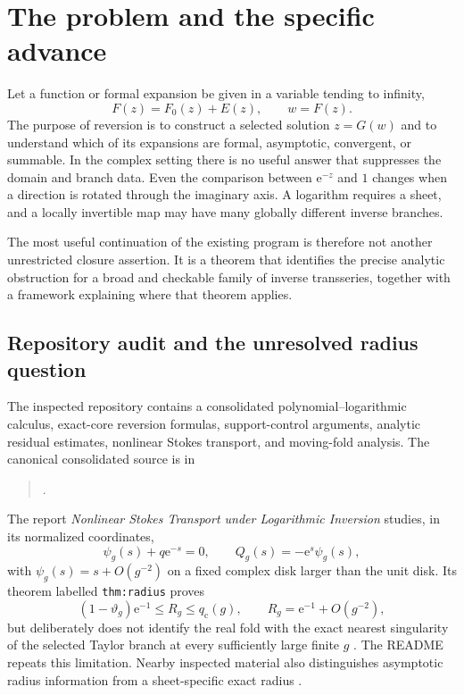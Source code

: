 \documentclass[11pt,a4paper]{article}
\numberwithin{equation}{section}
\theoremstyle{definition}
\theoremstyle{remark}
\newcommand{\e}{\mathrm e}
\begin{document}
\section{The problem and the specific advance}
\label{sec:intro}
Let a function or formal expansion be given in a variable tending to infinity,
\begin{equation}
 F(z)=F_0(z)+E(z),\qquad w=F(z).
 \label{eq:original}
\end{equation}
The purpose of reversion is to construct a selected solution $z=G(w)$ and to understand which of its expansions are formal, asymptotic, convergent, or summable. In the complex setting there is no useful answer that suppresses the domain and branch data. Even the comparison between $\e^{-z}$ and $1$ changes when a direction is rotated through the imaginary axis. A logarithm requires a sheet, and a locally invertible map may have many globally different inverse branches.

The most useful continuation of the existing program is therefore not another unrestricted closure assertion. It is a theorem that identifies the precise analytic obstruction for a broad and checkable family of inverse transseries, together with a framework explaining where that theorem applies.

\subsection{Repository audit and the unresolved radius question}
The inspected repository contains a consolidated polynomial--logarithmic calculus, exact-core reversion formulas, support-control arguments, analytic residual estimates, nonlinear Stokes transport, and moving-fold analysis. The canonical consolidated source is in
\begin{quote}\small{}.
\end{quote}
The report \emph{Nonlinear Stokes Transport under Logarithmic Inversion} studies, in its normalized coordinates,
\begin{equation}
 \psi_g(s)+q\e^{-s}=0,
 \qquad Q_g(s)=-\e^s\psi_g(s),
 \label{eq:repo-normalization}
\end{equation}
with $\psi_g(s)=s+O(g^{-2})$ on a fixed complex disk larger than the unit disk. Its theorem labelled \texttt{thm:radius} proves
\begin{equation}
 (1-\vartheta_g)\e^{-1}\leq R_g\leq q_{\mathrm c}(g),
 \qquad R_g=\e^{-1}+O(g^{-2}),
 \label{eq:old-radius}
\end{equation}
but deliberately does not identify the real fold with the exact nearest singularity of the selected Taylor branch at every sufficiently large finite $g$ \cite{repo-stokes}. The README repeats this limitation. Nearby inspected material also distinguishes asymptotic radius information from a sheet-specific exact radius \cite{repo-moments}.
\end{document}
